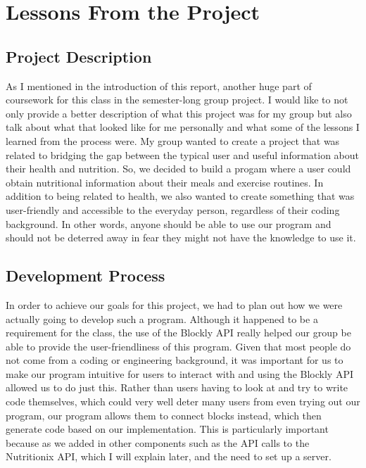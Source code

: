 \documentclass{article}
\theoremstyle{theorem}
\theoremstyle{definition}
\theoremstyle{remark}
\begin{document}
\section{Lessons From the Project}\label{Lessons From the Project}


\subsection{Project Description} 

As I mentioned in the introduction of this report, another huge part of coursework for this class in the semester-long group project. I would like to not only provide a better description of what this project was for my group but also talk about what that looked like for me 
personally and what some of the lessons I learned from the process were. My group wanted to create a project that was related to bridging the gap between the typical user and useful information about their health and nutrition. So, we decided to build a progam where a user could 
obtain nutritional information about their meals and exercise routines. In addition to being related to health, we also wanted to create something that was user-friendly and accessible to the everyday person, regardless of their coding background. In other words, anyone should be able 
to use our program and should not be deterred away in fear they might not have the knowledge to use it. \\

\subsection{Development Process} 

In order to achieve our goals for this project, we had to plan out how we were actually going to develop such a program. Although it happened to be a requirement for the class, the use of the Blockly API really helped our group be able to provide the user-friendliness of this program. Given 
that most people do not come from a coding or engineering background, it was important for us to make our program intuitive for users to interact with and using the Blockly API allowed us to do just this. Rather than users having to look at and try to write code themselves, which could 
very well deter many users from even trying out our program, our program allows them to connect blocks instead, which then generate code based on our implementation. This is particularly important because as we added in other components such as the API calls to the Nutritionix API, which I will 
explain later, and the need to set up a server. \\
\end{document}

